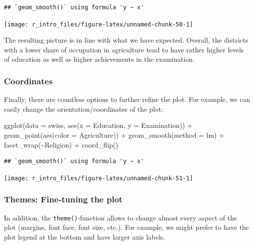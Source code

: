 \documentclass[
  12pt,
]{style/krantz}
\newenvironment{Shaded}{\begin{snugshade}}{\end{snugshade}}
\newcommand{\AttributeTok}[1]{\textcolor[rgb]{0.77,0.63,0.00}{#1}}
\newcommand{\FunctionTok}[1]{\textcolor[rgb]{0.00,0.00,0.00}{#1}}
\newcommand{\NormalTok}[1]{#1}
\newcommand{\SpecialCharTok}[1]{\textcolor[rgb]{0.00,0.00,0.00}{#1}}
\newcommand{\StringTok}[1]{\textcolor[rgb]{0.31,0.60,0.02}{#1}}
\begin{document}
\begin{verbatim}
## `geom_smooth()` using formula 'y ~ x'
\end{verbatim}

\texttt{[image: r\_intro\_files/figure-latex/unnamed-chunk-50-1]}

The resulting picture is in line with what we have expected. Overall, the districts with a lower share of occupation in agriculture tend to have rather higher levels of education as well as higher achievements in the examination.

\hypertarget{coordinates}{%
\subsubsection{Coordinates}\label{coordinates}}

Finally, there are countless options to further refine the plot. For example, we can easily change the orientation/coordinates of the plot:

\begin{Shaded}
\begin{Highlighting}[]
\FunctionTok{ggplot}\NormalTok{(}\AttributeTok{data =}\NormalTok{ swiss, }\FunctionTok{aes}\NormalTok{(}\AttributeTok{x =}\NormalTok{ Education, }\AttributeTok{y =}\NormalTok{ Examination)) }\SpecialCharTok{+} 
     \FunctionTok{geom\_point}\NormalTok{(}\FunctionTok{aes}\NormalTok{(}\AttributeTok{color =}\NormalTok{ Agriculture)) }\SpecialCharTok{+}
     \FunctionTok{geom\_smooth}\NormalTok{(}\AttributeTok{method =} \StringTok{\textquotesingle{}lm\textquotesingle{}}\NormalTok{) }\SpecialCharTok{+}
     \FunctionTok{facet\_wrap}\NormalTok{(}\SpecialCharTok{\textasciitilde{}}\NormalTok{Religion) }\SpecialCharTok{+}
     \FunctionTok{coord\_flip}\NormalTok{()}
\end{Highlighting}
\end{Shaded}

\begin{verbatim}
## `geom_smooth()` using formula 'y ~ x'
\end{verbatim}

\texttt{[image: r\_intro\_files/figure-latex/unnamed-chunk-51-1]}

\hypertarget{themes-fine-tuning-the-plot}{%
\subsubsection{Themes: Fine-tuning the plot}\label{themes-fine-tuning-the-plot}}

In addition, the \texttt{theme()}-function allows to change almost every aspect of the plot (margins, font face, font size, etc.). For example, we might prefer to have the plot legend at the bottom and have larger axis labels.
\end{document}
